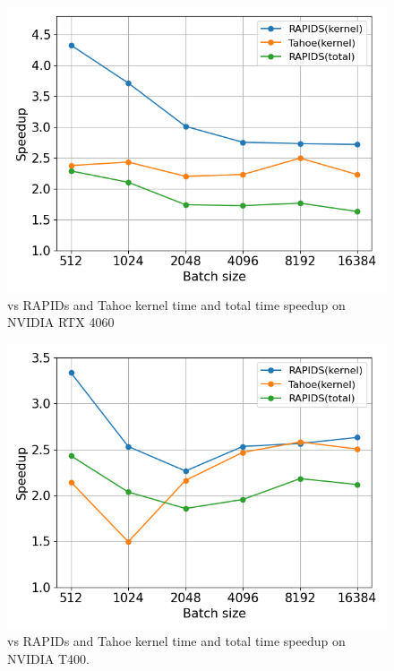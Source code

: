 
\begin{figure}[htb]
  \centering
  \includegraphics[width=0.75\linewidth]{figures/geomean_speedup_4060_kernel_time_total_time.png}
  \caption{\Treebeard{} vs RAPIDs and Tahoe kernel time and total time speedup on NVIDIA RTX 4060}
  \label{Fig:TBvsRAPIDsTahoe_4060_Speedup}
\end{figure}

\begin{figure}[htb]
  \centering
  \includegraphics[width=0.75\linewidth]{figures/geomean_speedup_T400_kernel_time.png}
  \caption{\Treebeard{} vs RAPIDs and Tahoe kernel time and total time speedup on NVIDIA T400.}
  \label{Fig:TBvsRAPIDsTahoe_T400_Speedup}
\end{figure}



